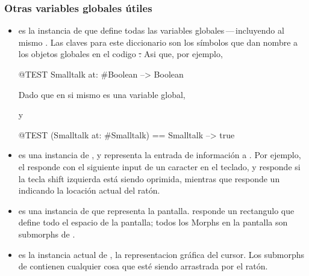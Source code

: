 \documentclass[a4paper,10pt,twoside]{book}
\begin{document}

\subsubsection{Otras variables globales \'utiles}

\begin{itemize}
\item
{} es la instancia de  que define todas las variables globales\,---\,incluyendo al mismo .   
Las claves para este diccionario son los s\'imbolos que dan nombre a los objetos globales en el codigo \st.
Asi que, por ejemplo,
\begin{code}{@TEST}
Smalltalk at: #Boolean --> Boolean
\end{code}
Dado que  en si mismo es una variable global,
\begin{code}{}
Smalltalk at: #Smalltalk-->a SystemDictionary(lots of globals)}
\end{code} 
y
\begin{code}{@TEST}
(Smalltalk at: #Smalltalk) == Smalltalk --> true
\end{code}

\item {} es una instancia de , y representa la entrada de informaci\'on a \pharo.
Por ejemplo, el  responde con el siguiente input de un caracter en el teclado, y  responde  si la tecla shift izquierda est\'a siendo oprimida, mientras que  responde un  indicando la locaci\'on actual del rat\'on.

\item {} es una instancia de  que representa la pantalla.
 responde un rectangulo que define todo el espacio de la pantalla; todos los Morphs en la pantalla son submorphs de .

\item 
{} es la instancia actual de , la representacion gr\'afica del cursor.  Los submorphs de  contienen cualquier cosa que est\'e siendo arrastrada por el rat\'on.


\end{itemize}
\end{document}
